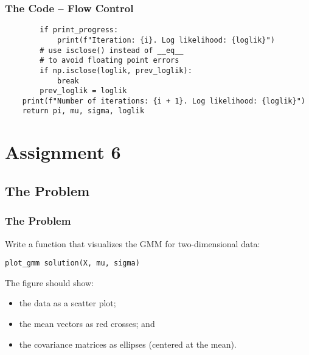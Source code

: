 \documentclass[11pt]{beamer}
\begin{document}
   \begin{frame}[fragile=singleslide]
        \frametitle{The Code -- Flow Control}
        \begin{verbatim}
        if print_progress:
            print(f"Iteration: {i}. Log likelihood: {loglik}")
        # use isclose() instead of __eq__
        # to avoid floating point errors
        if np.isclose(loglik, prev_loglik):
            break
        prev_loglik = loglik
    print(f"Number of iterations: {i + 1}. Log likelihood: {loglik}")
    return pi, mu, sigma, loglik
        \end{verbatim}
    \end{frame}
	\section{Assignment 6}
    \subsection{The Problem}
    \begin{frame}[fragile=singleslide]
        \frametitle{The Problem}
        Write a function that visualizes the GMM for two-dimensional data:
        \begin{verbatim}
plot_gmm solution(X, mu, sigma)
        \end{verbatim}
        The figure should show:
        \begin{itemize}
            \item the data as a scatter plot;
            \item the mean vectors as red crosses; and
            \item the covariance matrices as ellipses (centered at the mean).
        \end{itemize}
    \end{frame}
\end{document}
